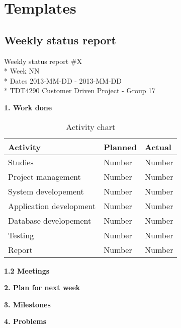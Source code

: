 \chapter{Templates}
\label{AppendixC} 

\section{Weekly status report}


\begin{center}
Weekly status report \#X\\*
Week NN \\*
Dates 2013-MM-DD - 2013-MM-DD \\*
TDT4290 Customer Driven Project - Group 17
\end{center}

\textbf{1. Work done}

\begin{table}[H]
\begin{center}
\begin{tabular}{ l | l | l }
  \hline
  Activity & Planned & Actual \\
  \hline\noalign{\smallskip}\noalign{\smallskip}\hline
  Studies & Number & Number \\
  Project management & Number & Number \\
  System developement & Number & Number \\
  Application development & Number & Number \\
  Database developement & Number & Number \\
  Testing & Number & Number \\
  Report & Number & Number \\
  \hline
\end{tabular}
\end{center}
\caption{Activity chart}
\label{table:activityChartStatusReport}
\end{table}

\textbf{1.2 Meetings}

\textbf{2. Plan for next week}

\textbf{3. Milestones}

\textbf{4. Problems}


